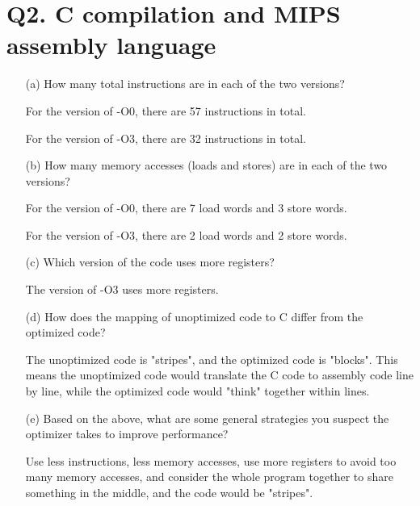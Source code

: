 \documentclass{article}
\theoremstyle{remark}
\theoremstyle{definition}
\begin{document}
    \section{Q2. C compilation and MIPS assembly language}
    \begin{enumerate}
        \item[(a)] How many total instructions are in each of the two versions?

        For the version of -O0, there are 57 instructions in total.

        For the version of -O3, there are 32 instructions in total.
        \item[(b)] How many memory accesses (loads and stores) are in each of the two versions?

        For the version of -O0, there are 7 load words and 3 store words.

        For the version of -O3, there are 2 load words and 2 store words.
        \item[(c)] Which version of the code uses more registers?

        The version of -O3 uses more registers.
        \item[(d)] How does the mapping of unoptimized code to C differ from the optimized code?

        The unoptimized code is "stripes", and the optimized code is "blocks".
        This means the unoptimized code would translate the C code to assembly code line by line, while the optimized code would "think" together within lines.
        \item[(e)] Based on the above, what are some general strategies you suspect the optimizer takes to improve performance?

        Use less instructions, less memory accesses, use more registers to avoid too many memory accesses, and consider the whole program together to share something in the middle, and the code would be "stripes".
    \end{enumerate}
\end{document}
